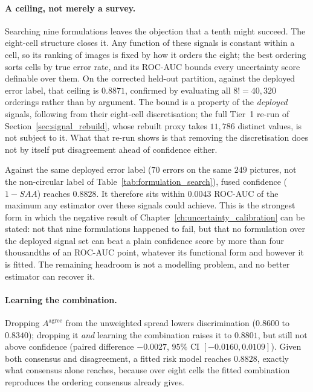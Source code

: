 \documentclass[12pt,a4paper]{report}
\begin{document}
\paragraph{A ceiling, not merely a survey.} Searching nine formulations leaves the objection that a
tenth might succeed. The eight-cell structure closes it. Any function of these signals is constant
within a cell, so its ranking of images is fixed by how it orders the eight; the best ordering
sorts cells by true error rate, and its ROC-AUC bounds every uncertainty score definable over
them. On the corrected held-out partition, against the deployed error label, that ceiling is $\mathbf{0.8871}$, confirmed by
evaluating all $8! = 40{,}320$ orderings rather than by argument. The bound is a property of
the \emph{deployed} signals, following from their eight-cell discretisation;
the full Tier~1 re-run of Section~\ref{sec:signal_rebuild}, whose rebuilt proxy takes $11{,}786$
distinct values, is not subject to it. What that re-run shows is that removing the
discretisation does not by itself put disagreement ahead of confidence either.

Against the same deployed error label ($70$ errors on the same $249$ pictures, not the non-circular label of Table~\ref{tab:formulation_search}), fused confidence ($1 - SAA$) reaches $0.8828$. It therefore sits within
$\mathbf{0.0043}$ ROC-AUC of the maximum any estimator over these signals could achieve. This is
the strongest form in which the negative result of Chapter~\ref{ch:uncertainty_calibration} can be stated: not that nine
formulations happened to fail, but that no formulation over the deployed signal set can beat a
plain confidence score by more than four thousandths of an ROC-AUC point, whatever its
functional form and however it is fitted. The remaining headroom is not a modelling problem, and
no better estimator can recover it.

\paragraph{Learning the combination.} Dropping $A^{\text{agree}}$ from the unweighted spread lowers discrimination ($0.8600$ to $0.8340$); dropping it \emph{and} learning the combination raises it to $0.8801$, but still not above confidence (paired difference $-0.0027$, $95\%$ CI $[-0.0160, 0.0109]$). Given both consensus and disagreement, a fitted risk model reaches $0.8828$, exactly what consensus alone reaches, because over eight cells the fitted combination reproduces the ordering consensus already gives.
\end{document}
